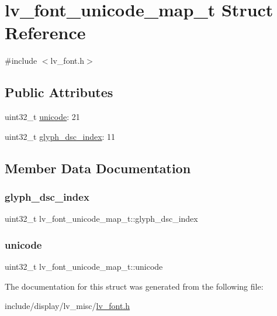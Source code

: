 \hypertarget{structlv__font__unicode__map__t}{}\section{lv\+\_\+font\+\_\+unicode\+\_\+map\+\_\+t Struct Reference}
\label{structlv__font__unicode__map__t}


{\ttfamily \#include $<$lv\+\_\+font.\+h$>$}

\subsection*{Public Attributes}
\begin{DoxyCompactItemize}
\item 
uint32\+\_\+t \mbox{\hyperlink{structlv__font__unicode__map__t_a651433b36859744422a450ed4c047b51}{unicode}}\+: 21
\item 
uint32\+\_\+t \mbox{\hyperlink{structlv__font__unicode__map__t_a74abd7b7037bbafd86df6c34bbb2ca20}{glyph\+\_\+dsc\+\_\+index}}\+: 11
\end{DoxyCompactItemize}


\subsection{Member Data Documentation}
\mbox{\label{structlv__font__unicode__map__t_a74abd7b7037bbafd86df6c34bbb2ca20}} 
\subsubsection{\texorpdfstring{glyph\_dsc\_index}{glyph\_dsc\_index}}
{\footnotesize\ttfamily uint32\+\_\+t lv\+\_\+font\+\_\+unicode\+\_\+map\+\_\+t\+::glyph\+\_\+dsc\+\_\+index}

\mbox{\label{structlv__font__unicode__map__t_a651433b36859744422a450ed4c047b51}} 
\subsubsection{\texorpdfstring{unicode}{unicode}}
{\footnotesize\ttfamily uint32\+\_\+t lv\+\_\+font\+\_\+unicode\+\_\+map\+\_\+t\+::unicode}



The documentation for this struct was generated from the following file\+:\begin{DoxyCompactItemize}
\item 
include/display/lv\+\_\+misc/\mbox{\hyperlink{lv__font_8h}{lv\+\_\+font.\+h}}\end{DoxyCompactItemize}
